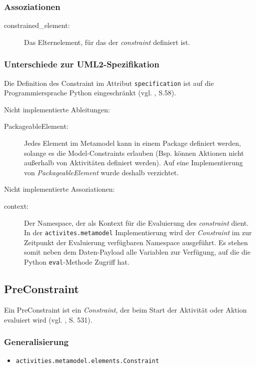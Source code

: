 \subsubsection{Assoziationen}
\begin{description}
\item[constrained\_element:] Das Elternelement, für das der \emph{constraint} definiert ist.
\end{description}


\subsubsection{Unterschiede zur UML2-Spezifikation}
Die Definition des Constraint im Attribut \texttt{specification} ist auf die Programmiersprache Python eingeschränkt (vgl. \citep{OMG2009}, S.58).

Nicht implementierte Ableitungen:
\begin{description}
\item[PackageableElement:] Jedes Element im Metamodel kann in einem Package definiert werden, solange es die Model-Constraints erlauben (Bsp. können Aktionen nicht außerhalb von Aktivitäten definiert werden). Auf eine Implementierung von \emph{PackageableElement} wurde deshalb verzichtet.
\end{description}

Nicht implementierte Assoziationen:
\begin{description}
\item[context:] Der Namespace, der als Kontext für die Evaluierung des \emph{constraint} dient. In der \texttt{activites.metamodel} Implementierung wird der \emph{Constraint} im zur Zeitpunkt der Evaluierung verfügbaren Namespace ausgeführt. Es stehen somit neben dem Daten-Payload alle Variablen zur Verfügung, auf die die Python \texttt{eval}-Methode Zugriff hat.
\end{description}


\subsection{PreConstraint}
Ein PreConstraint ist ein \emph{Constraint}, der beim Start der Aktivität oder Aktion evaluiert wird (vgl. \citep{RumbaughJacobsonBooch2005}, S. 531).

\subsubsection{Generalisierung}
\begin{itemize}
\item \texttt{activities.metamodel.elements.Constraint}
\end{itemize}

